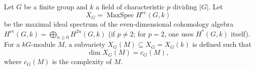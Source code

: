 Let $G$ be a finite group and $k$ a field of characteristic $p$ dividing $|G|$. Let
$$X_G = \operatorname{MaxSpec} H^{\text{ev}}(G, k)$$
be the maximal ideal spectrum of the even-dimensional cohomology algebra $H^{\text{ev}}(G, k) = \bigoplus_{n \geq 0} H^{2n}(G, k)$ (if $p \neq 2$; for $p = 2$, one uses $H^*(G, k)$ itself). For a $kG$-module $M$, a subvariety $X_G(M) \subseteq X_G = X_G(k)$ is defined such that
$$\dim X_G(M) = c_G(M),$$
where $c_G(M)$ is the complexity of $M$.
